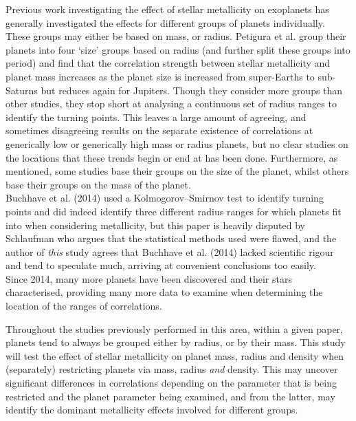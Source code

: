 \documentclass[a4paper,twocolumn,12pt]{article}
\begin{document}
Previous work investigating the effect of stellar metallicity on exoplanets has generally investigated the effects for different groups of planets individually. These groups may either be based on mass, or radius. Petigura et al. \cite{Petigura.et.al.} group their planets into four `size' groups based on radius (and further split these groups into period) and find that the correlation strength between stellar metallicity and planet mass increases as the planet size is increased from super-Earths to sub-Saturns but reduces again for Jupiters. Though they consider more groups than other studies, they stop short at analysing a continuous set of radius ranges to identify the turning points. This leaves a large amount of agreeing, and sometimes disagreeing results on the separate existence of correlations at generically low or generically high mass or radius planets, but no clear studies on the locations that these trends begin or end at has been done. Furthermore, as mentioned, some studies base their groups on the size of the planet, whilst others base their groups on the mass of the planet.\\
Buchhave et al. (2014)\cite{Buchhave.et.al.2014} used a Kolmogorov–Smirnov test to identify turning points and did indeed identify three different radius ranges for which planets fit into when considering metallicity, but this paper is heavily disputed by Schlaufman \cite{Schlaufman} who argues that the statistical methods used were flawed, and the author of \textit{this} study agrees that Buchhave et al. (2014) lacked scientific rigour and tend to speculate much, arriving at convenient conclusions too easily.\\
Since 2014, many more planets have been discovered and their stars characterised, providing many more data to examine when determining the location of the ranges of correlations.


Throughout the studies previously performed in this area, within a given paper, planets tend to always be grouped either by radius, or by their mass. This study will test the effect of stellar metallicity on planet mass, radius and density when (separately) restricting planets via mass, radius \textit{and} density. This may uncover significant differences in correlations depending on the parameter that is being restricted and the planet parameter being examined, and from the latter, may identify the dominant metallicity effects involved for different groups.


\end{document}
